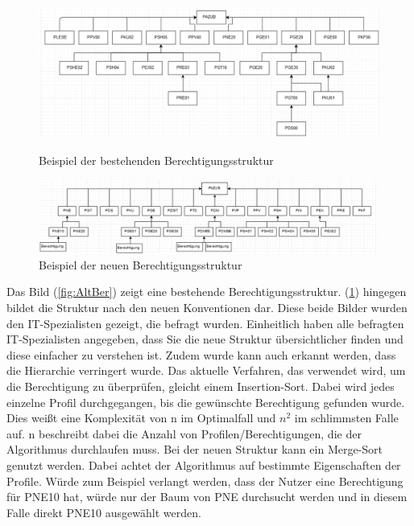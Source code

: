 \begin{figure}[h!]
\hspace*{-2cm}
 \centering
 \includegraphics[width=1.25\textwidth]{gfx/Picture/Vorher.PNG}
 \caption{Beispiel der bestehenden Berechtigungsstruktur}
 \label{fig:AltBer}
\hspace*{-2cm}
 \centering
 \includegraphics[width=1.25\textwidth]{gfx/Picture/Nachher.PNG}
 \caption{Beispiel der neuen Berechtigungsstruktur}
 \label{fig:NeuBer}
\end{figure}
Das Bild (\ref{fig:AltBer}) zeigt eine bestehende Berechtigungsstruktur.
(\ref{fig:NeuBer}) hingegen bildet die Struktur nach den neuen Konventionen dar.
Diese beide Bilder wurden den IT-Spezialisten gezeigt, die befragt wurden.
Einheitlich haben alle befragten IT-Spezialisten angegeben, dass Sie die neue Struktur übersichtlicher finden und diese einfacher zu verstehen ist.
Zudem wurde kann auch erkannt werden, dass die Hierarchie verringert wurde.
\newline
Das aktuelle Verfahren, das verwendet wird, um die Berechtigung zu überprüfen, gleicht einem Insertion-Sort.
Dabei wird jedes einzelne Profil durchgegangen, bis die gewünschte Berechtigung gefunden wurde.
Dies weißt eine Komplexität von n im Optimalfall und $n^2$ im schlimmsten Falle auf.
n beschreibt dabei die Anzahl von Profilen/Berechtigungen, die der Algorithmus durchlaufen muss. \cite{log, S.12, weblogMer}
\newline
Bei der neuen Struktur kann ein Merge-Sort genutzt werden.
Dabei achtet der Algorithmus auf bestimmte Eigenschaften der Profile.
Würde zum Beispiel verlangt werden, dass der Nutzer eine Berechtigung für PNE10 hat, würde nur der Baum von PNE durchsucht werden und in diesem Falle direkt PNE10 ausgewählt werden.
